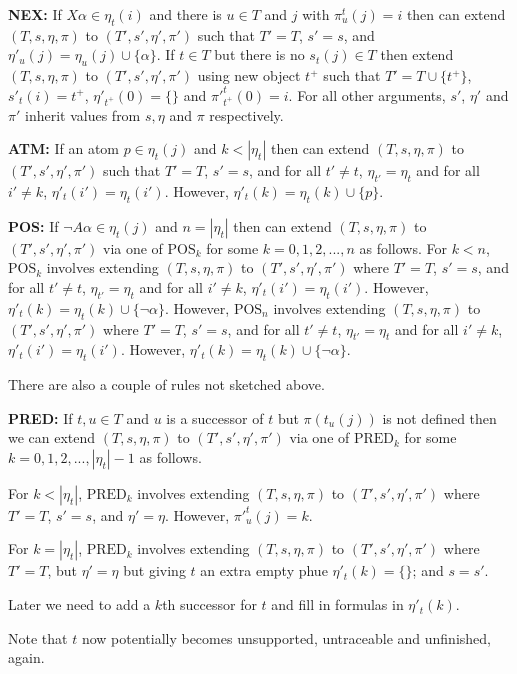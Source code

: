 \documentclass[submission,copyright,creativecommons]{eptcs}
\begin{document}
{\bf NEX:}
If $X \alpha  \in \eta_t(i)$ 
and
there is $u \in T$ and $j$
with $\pi^t_u(j) =i$
then can extend $(T,s,\eta,\pi)$ to $(T',s',\eta',\pi')$
such that
$T'=T$,
$s'=s$,
and
$\eta'_{u}(j)=\eta_u(j) \cup \{ \alpha \}$.
If $t \in T$ 
but there is no $s_t(j) \in T$
then extend $(T,s,\eta,\pi)$ to $(T',s',\eta',\pi')$
using new object $t^+$
such that
$T'=T \cup \{ t^+ \}$,
$s'_t(i)=t^+$,
$\eta'_{t^+}(0)=\{  \}$
and $\pi'^t_{t^+}(0)=i$.
For all other arguments, $s'$, $\eta'$ and $\pi'$ inherit values from
$s, \eta$ and $\pi$ respectively.


{\bf ATM:}
If an atom $p  \in \eta_t(j)$ 
and $k<|\eta_t|$
then can extend $(T,s,\eta,\pi)$ to $(T',s',\eta',\pi')$
such that
$T'=T$,
$s'=s$,
and
for all $t' \neq t$,
$\eta_{t'}=\eta_t$
and
for all $i' \neq k$,
$\eta'_t(i')=\eta_t(i')$.
However,
$\eta'_{t}(k)=\eta_t(k) \cup \{ p \}$.


{\bf POS:}
If $\neg A \alpha  \in \eta_t(j)$
and $n=|\eta_t|$ 
then can extend $(T,s,\eta,\pi)$ to $(T',s',\eta',\pi')$
via one of
$\mbox{POS}_k$ for some
$k=0, 1, 2, ..., n$
as follows.
For $k<n$, $\mbox{POS}_k$ involves 
extending $(T,s,\eta,\pi)$ to $(T',s',\eta',\pi')$
where
$T'=T$,
$s'=s$,
and
for all $t' \neq t$,
$\eta_{t'}=\eta_t$
and
for all $i' \neq k$,
$\eta'_t(i')=\eta_t(i')$.
However,
$\eta'_{t}(k)=\eta_t(k) \cup \{ \neg \alpha \}$.
However, $\mbox{POS}_n$ involves 
extending $(T,s,\eta,\pi)$ to $(T',s',\eta',\pi')$
where
$T'=T$,
$s'=s$,
and
for all $t' \neq t$,
$\eta_{t'}=\eta_t$
and
for all $i' \neq k$,
$\eta'_t(i')=\eta_t(i')$.
However,
$\eta'_{t}(k)=\eta_t(k) \cup \{ \neg \alpha \}$.

There are also a couple of rules not sketched above.

{\bf PRED:}
If $t,u \in T$ and 
$u$ is a successor of $t$ but
$\pi(t_u(j))$ is not defined
then we can extend $(T,s,\eta,\pi)$ to $(T',s',\eta',\pi')$
via one of
$\mbox{PRED}_k$ for some
$k=0, 1, 2, ..., |\eta_t|-1$
as follows.

For $k<|\eta_t|$, $\mbox{PRED}_k$ involves 
extending $(T,s,\eta,\pi)$ to $(T',s',\eta',\pi')$
where
$T'=T$,
$s'=s$,
and
$\eta'=\eta$.
However,
$\pi'^t_{u}(j)=k$.

For $k=|\eta_t|$,
$\mbox{PRED}_k$ involves 
extending $(T,s,\eta,\pi)$ to $(T',s',\eta',\pi')$
where
$T'=T$, but
$\eta'=\eta$ but giving $t$ an extra empty phue $\eta'_{t}(k)=\{\}$;
and
$s=s'$.

Later we need to add a $k$th successor for $t$ and
fill in formulas in $\eta'_t(k)$.

Note that $t$ now potentially becomes 
unsupported, untraceable and unfinished, again.
\end{document}
